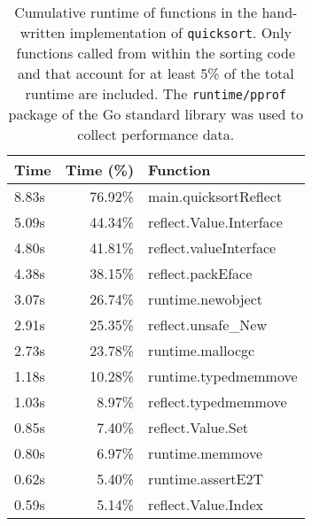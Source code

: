 \documentclass[letterpaper,11pt]{article}
\begin{document}
\begin{table}
\centering
\begin{tabular}{lrl}
Time & Time (\%{}) & Function \\
\hline
8.83s & 76.92\%{} & main.quicksortReflect \\
5.09s & 44.34\%{} & reflect.Value.Interface \\
4.80s & 41.81\%{} & reflect.valueInterface \\
4.38s & 38.15\%{} & reflect.packEface \\
3.07s & 26.74\%{} & runtime.newobject \\
2.91s & 25.35\%{} & reflect.unsafe\_{}New \\
2.73s & 23.78\%{} & runtime.mallocgc \\
1.18s & 10.28\%{} & runtime.typedmemmove \\
1.03s & 8.97\%{} & reflect.typedmemmove \\
0.85s & 7.40\%{} & reflect.Value.Set \\
0.80s & 6.97\%{} & runtime.memmove \\
0.62s & 5.40\%{} & runtime.assertE2T \\
0.59s & 5.14\%{} & reflect.Value.Index \\
\end{tabular}
\begin{comment}
#+ORGTBL: SEND sortreflectprofile orgtbl-to-latex :splice nil :skip 0
| Time  | Time (%
|-------+----------+-------------------------|
| 8.83s |   76.92%
| 5.09s |   44.34%
| 4.80s |   41.81%
| 4.38s |   38.15%
| 3.07s |   26.74%
| 2.91s |   25.35%
| 2.73s |   23.78%
| 1.18s |   10.28%
| 1.03s |    8.97%
| 0.85s |    7.40%
| 0.80s |    6.97%
| 0.62s |    5.40%
| 0.59s |    5.14%
\end{comment}
\caption{Cumulative runtime of functions in the hand-written implementation of \texttt{quicksort}. Only functions called from within the sorting code and that account for at least 5\% of the total runtime are included. The \texttt{runtime/pprof} package of the Go standard library was used to collect performance data.}\label{tab:reflectprofile}
\end{table}
\end{document}
